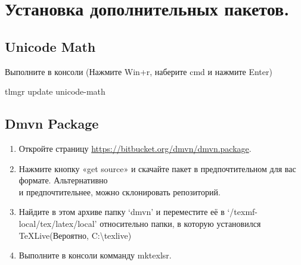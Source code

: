 \section{Установка дополнительных пакетов.}

\subsection{Unicode Math}
Выполните в консоли (Нажмите Win+r, наберите {\ttfamily cmd} и нажмите {\ttfamily Enter})\par
{\ttfamily tlmgr update unicode-math}

\subsection{Dmvn Package}
\begin{enumerate}
  \item Откройте страницу \url{https://bitbucket.org/dmvn/dmvn.package}.
  \item Нажмите кнопку «get source» и скачайте пакет в предпочтительном для вас формате. Альтернативно \\
    и предпочтительнее, можно склонировать репозиторий.
  \item Найдите в этом архиве папку `{\ttfamily dmvn}'  и переместите её в `{\ttfamily /texmf-local/tex/latex/local}' относительно папки, в которую установился
  TeXLive(Вероятно, {\ttfamily C:\backslash texlive})
  \item Выполните в консоли комманду {\ttfamily mktexlsr}.
\end{enumerate}
